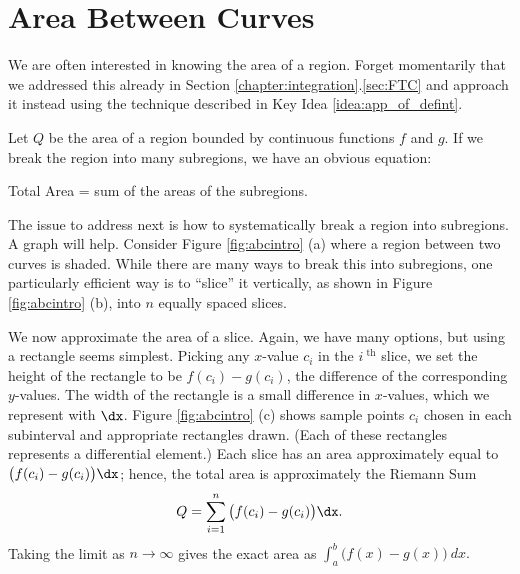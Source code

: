 \section{Area Between Curves}\label{sec:ABC}

We are often interested in knowing the area of a region. Forget momentarily that we addressed this already in Section  \ref{chapter:integration}.\ref{sec:FTC} and approach it instead using the technique described in Key Idea \ref{idea:app_of_defint}. 

Let $Q$ be the area of a region bounded by continuous functions $f$ and $g$. If we break the region into many subregions, we have an obvious equation:

\hfill Total Area = sum of the areas of the subregions. \hfill \null

The issue to address next is how to systematically break a region into subregions. A graph will help. Consider Figure \ref{fig:abcintro} (a) where a region between two curves is shaded. While there are many ways to break this into subregions, one particularly efficient way is to ``slice'' it vertically, as shown in Figure \ref{fig:abcintro} (b), into $n$ equally spaced slices. 

We now approximate the area of a slice. Again, we have many options, but using a rectangle seems simplest. Picking any $x$-value $c_i$ in the $i^\text{ th}$ slice, we set the height of the rectangle to be $f(c_i)-g(c_i)$, the difference of the corresponding $y$-values. The width of the rectangle is a small difference in $x$-values, which we represent with $\dx$. Figure \ref{fig:abcintro} (c) shows sample points $c_i$ chosen in each subinterval and appropriate rectangles drawn. (Each of these rectangles represents a differential element.) Each slice has an area approximately equal to $\big(f(c_i)-g(c_i)\big)\dx$; hence, the total area is approximately the Riemann Sum
$$Q = \sum_{i=1}^n \big(f(c_i)-g(c_i)\big)\dx.$$
Taking the limit as $n\to \infty$ gives the exact area as $\int_a^b \big(f(x)-g(x)\big)\ dx.$


